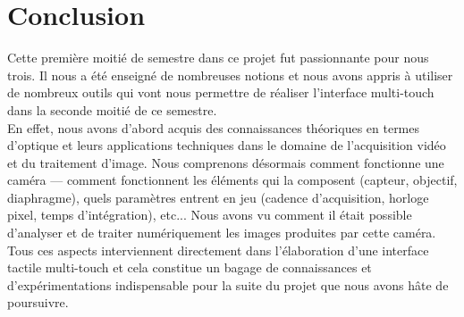 \section*{Conclusion}

Cette première moitié de semestre dans ce projet fut passionnante pour nous trois. Il nous a
été enseigné de nombreuses notions et nous avons appris à utiliser de nombreux outils qui vont nous
permettre de réaliser l’interface multi-touch dans la seconde moitié de ce semestre.\\

En effet, nous avons d’abord acquis des connaissances théoriques en termes d’optique et leurs
applications techniques dans le domaine de l’acquisition vidéo et du traitement d’image. Nous
comprenons désormais comment fonctionne une caméra --- comment fonctionnent les éléments qui
la composent (capteur, objectif, diaphragme), quels paramètres entrent en jeu (cadence
d’acquisition, horloge pixel, temps d’intégration), etc... Nous avons vu comment il était possible
d’analyser et de traiter numériquement les images produites par cette caméra. Tous ces aspects
interviennent directement dans l’élaboration d’une interface tactile multi-touch et cela constitue un
bagage de connaissances et d’expérimentations indispensable pour la suite du projet que nous avons
hâte de poursuivre.